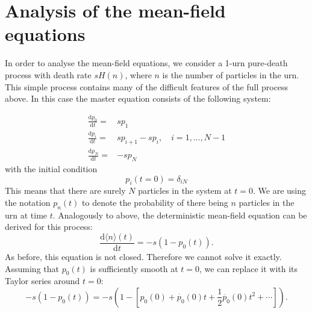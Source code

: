 \documentclass[a4paper,11pt]{article}
\numberwithin{equation}{section}
\newcommand{\diff}[2]{\frac{\mathrm{d} #1}{\mathrm{d} #2}}
\newcommand{\E}[1]{\langle #1 \rangle}
\begin{document}
\FloatBarrier
\section{Analysis of the mean-field equations}
In order to analyse the mean-field equations, we consider a 1-urn pure-death
process with death rate \(s H(n)\), where \(n\) is the number of particles in
the urn. This simple process contains many of the difficult features of the full
process above. In this case the master equation consists of the following system:

\begin{align*}
    \diff{p_0}{t} =& s p_1\\
    \diff{p_i}{t} =& s p_{i+1} - s p_i, \quad i = 1,\dotsc,N-1\\
    \diff{p_N}{t} =& - s p_N
\end{align*}
with the initial condition
\begin{equation}
    \label{eqn:pure_death_ic}
    p_i(t=0) = \delta_{iN}
\end{equation}
This means that there are surely \(N\) particles in the system at \(t=0\). We
are using the notation \(p_n(t)\) to denote the probability of there being \(n\)
particles in the urn at time \(t\).  Analogously to above, the deterministic
mean-field equation can be derived for this process:
\begin{equation*}
    \diff{\E{n}(t)}{t} = -s \left(1-p_0(t)\right).
\end{equation*}
As before, this equation is not closed. Therefore we cannot solve it exactly.
Assuming that \(p_0(t)\) is sufficiently smooth at \(t=0\), we can replace it
with its Taylor series around \(t=0\):
\begin{equation*}
    -s(1-p_0(t)) = -s\left(1 - \left[p_0(0) + \dot{p_0}(0)t +
    \frac{1}{2}\ddot{p_0}(0)t^2 + \dotsb \right] \right).
\end{equation*}
\end{document}
